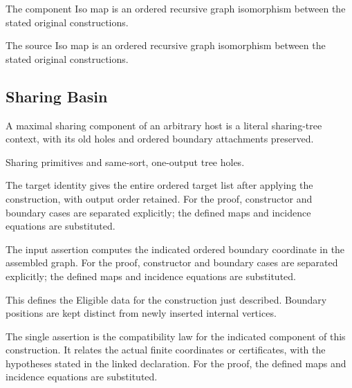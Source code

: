 The component Iso map is an ordered recursive graph isomorphism between the stated original constructions.
\par{}

The source Iso map is an ordered recursive graph isomorphism between the stated original constructions.
\par{}

\subsection{Sharing Basin}
A maximal sharing component of an arbitrary host is a literal sharing-tree context, with its old holes and ordered boundary attachments preserved.

Sharing primitives and same-sort, one-output tree holes.
\par{}

The target identity gives the entire ordered target list after applying the construction, with output order retained.
For the proof, constructor and boundary cases are separated explicitly; the defined maps and incidence equations are substituted.
\par{}

The input assertion computes the indicated ordered boundary coordinate in the assembled graph.
For the proof, constructor and boundary cases are separated explicitly; the defined maps and incidence equations are substituted.
\par{}

This defines the Eligible data for the construction just described. Boundary positions are kept distinct from newly inserted internal vertices.
\par{}

The single assertion is the compatibility law for the indicated component of this construction. It relates the actual finite coordinates or certificates, with the hypotheses stated in the linked declaration.
For the proof, the defined maps and incidence equations are substituted.
\par{}

